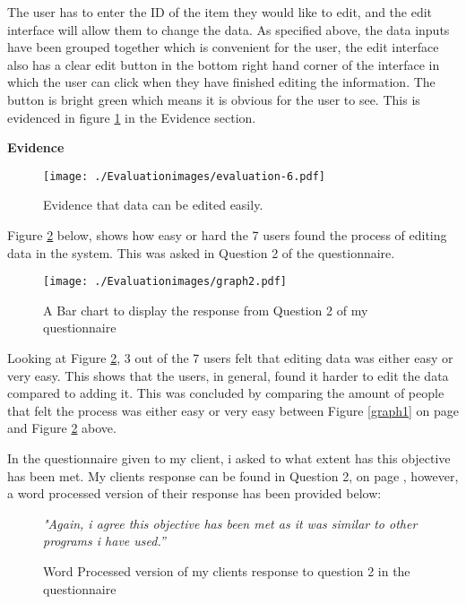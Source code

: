   The user has to enter the ID of the item they would like to edit, and the edit interface will allow them to change the data. As specified above, the data inputs have been grouped together which is convenient for the user, the edit interface also has a clear edit button in the bottom right hand corner of the interface in which the user can click when they have finished editing the information. The button is bright green which means it is obvious for the user to see. This is evidenced in figure \ref{fig:evaluation-6} in the Evidence section.\newline

\textbf{Evidence} \newline

\begin{figure}[H]
\caption{Evidence that data can be edited easily.} \label{fig:evaluation-6}
\hfill\texttt{[image: ./Evaluationimages/evaluation-6.pdf]}
\end{figure}

Figure \ref{graph2} below, shows how easy or hard the 7 users found the process of editing data in the system. This was asked in Question 2 of the questionnaire.

\begin{figure}[H]
\caption{A Bar chart to display the response from Question 2 of my questionnaire} \label{graph2}
\hfill\texttt{[image: ./Evaluationimages/graph2.pdf]}
\end{figure}

Looking at Figure \ref{graph2}, 3 out of the 7 users felt that editing data was either easy or very easy. This shows that the users, in general, found it harder to edit the data compared to adding it. This was concluded by comparing the amount of people that felt the process was either easy or very easy between Figure \ref{graph1} on page \pageref{graph1} and Figure \ref{graph2} above.

In the questionnaire given to my client, i asked to what extent has this objective has been met. My clients response can be found in Question 2, on page \pageref{Client-Q1}, however, a word processed version of their response has been provided below:

\begin{figure}[H]
\caption{Word Processed version of my clients response to question 2 in the questionnaire}
\vspace{3mm}
\textit{\large{"Again, i agree this objective has been met as it was similar to other programs i have used.''}}
\vspace{3mm}
\end{figure}

